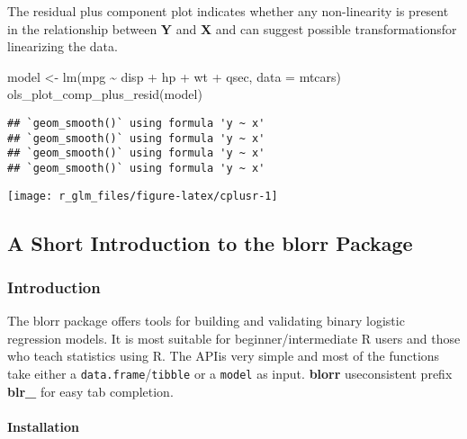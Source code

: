 \documentclass[
]{article}
\newenvironment{Shaded}{\begin{snugshade}}{\end{snugshade}}
\newcommand{\AttributeTok}[1]{\textcolor[rgb]{0.77,0.63,0.00}{#1}}
\newcommand{\FunctionTok}[1]{\textcolor[rgb]{0.00,0.00,0.00}{#1}}
\newcommand{\NormalTok}[1]{#1}
\newcommand{\OtherTok}[1]{\textcolor[rgb]{0.56,0.35,0.01}{#1}}
\newcommand{\SpecialCharTok}[1]{\textcolor[rgb]{0.00,0.00,0.00}{#1}}
\begin{document}
The residual plus component plot indicates whether any non-linearity is
present in the relationship between \textbf{Y} and \textbf{X} and can
suggest possible transformationsfor linearizing the data.

\begin{Shaded}
\begin{Highlighting}[]
\NormalTok{model }\OtherTok{\textless{}{-}} \FunctionTok{lm}\NormalTok{(mpg }\SpecialCharTok{\textasciitilde{}}\NormalTok{ disp }\SpecialCharTok{+}\NormalTok{ hp }\SpecialCharTok{+}\NormalTok{ wt }\SpecialCharTok{+}\NormalTok{ qsec, }\AttributeTok{data =}\NormalTok{ mtcars)}
\FunctionTok{ols\_plot\_comp\_plus\_resid}\NormalTok{(model)}
\end{Highlighting}
\end{Shaded}

\begin{verbatim}
## `geom_smooth()` using formula 'y ~ x'
## `geom_smooth()` using formula 'y ~ x'
## `geom_smooth()` using formula 'y ~ x'
## `geom_smooth()` using formula 'y ~ x'
\end{verbatim}

\begin{center}\texttt{[image: r\_glm\_files/figure-latex/cplusr-1]} \end{center}

\hypertarget{a-short-introduction-to-the-blorr-package}{%
\subsection{A Short Introduction to the blorr
Package}\label{a-short-introduction-to-the-blorr-package}}

\hypertarget{introduction-4}{%
\subsubsection{Introduction}\label{introduction-4}}

The blorr package offers tools for building and validating binary
logistic regression models. It is most suitable for
beginner/intermediate R users and those who teach statistics using R.
The APIis very simple and most of the functions take either a
\texttt{data.frame}/\texttt{tibble} or a \texttt{model} as input.
\textbf{blorr} useconsistent prefix \textbf{blr\_} for easy tab
completion.

\hypertarget{installation}{%
\paragraph{Installation}\label{installation}}
\end{document}
